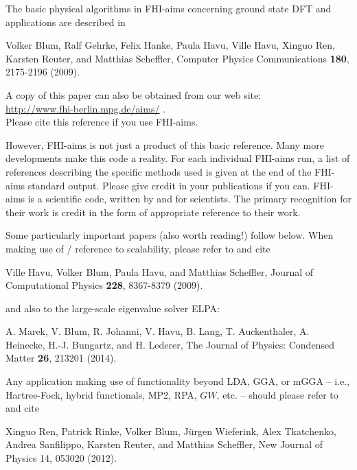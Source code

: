 The basic physical algorithms in FHI-aims concerning ground state DFT and
applications are described in

\begin{center}
\parbox[c]{0.8\textwidth}
{\small
Volker Blum, Ralf Gehrke, Felix Hanke, Paula Havu, Ville Havu, Xinguo Ren,
Karsten Reuter, and Matthias Scheffler, Computer Physics Communications
\textbf{180}, 2175-2196 (2009). 
}
\end{center}

A copy of this paper can also be obtained from our web site: \\
\url{http://www.fhi-berlin.mpg.de/aims/} . \\ Please cite this reference if you use
FHI-aims. 

However, FHI-aims is not just a product of this basic reference.
Many more developments make this code a reality. For each individual
FHI-aims  run, a list of references describing the specific methods
used is given at the end of the FHI-aims standard output. Please give
credit in your publications if you can. FHI-aims is
a scientific code, written by and for scientists. The primary
recognition for their work is credit in the form of appropriate
reference to their work. 

Some particularly important papers (also worth reading!) follow
below. When making use of / reference to scalability, please refer to
and cite 

\begin{center}
\parbox[c]{0.8\textwidth}
{\small
Ville Havu, Volker Blum, Paula Havu, and Matthias Scheffler, Journal of
Computational Physics \textbf{228}, 8367-8379 (2009).
}
\end{center}

and also to the large-scale eigenvalue solver ELPA:

\begin{center}
\parbox[c]{0.8\textwidth}
{\small
A. Marek, V. Blum, R. Johanni, V. Havu, B. Lang, T. Auckenthaler, 
A. Heinecke, H.-J. Bungartz, and H. Lederer, 
The Journal of Physics: Condensed Matter \textbf{26}, 213201 (2014). 
}
\end{center}

Any application making use of functionality beyond LDA, GGA, or mGGA
-- i.e., Hartree-Fock, hybrid functionals, MP2, RPA, $GW$, etc. --
should please refer to and cite

\begin{center}
\parbox[c]{0.8\textwidth}
{\small
Xinguo Ren, Patrick Rinke, Volker Blum, J\"urgen Wieferink, Alex
Tkatchenko, Andrea Sanfilippo, Karsten Reuter, and Matthias Scheffler,
New Journal of Physics 14, 053020 (2012).
}
\end{center}

